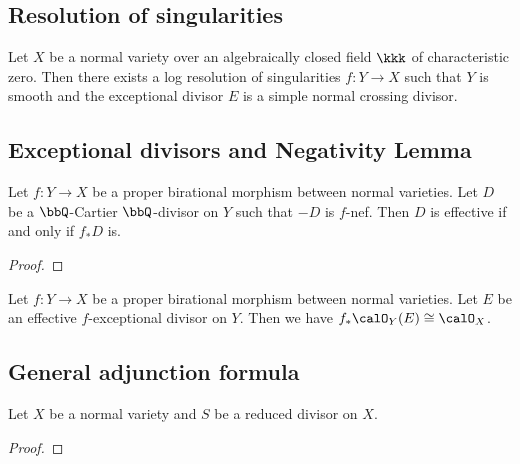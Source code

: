 \subsection{Resolution of singularities}

    \begin{theorem}\label{thm:log_resolution_in_characteristic_zero_for_varieties}
        Let \(X\) be a normal variety over an algebraically closed field \(\kkk\) of characteristic zero.
        Then there exists a log resolution of singularities \(f: Y \to X\) such that \(Y\) is smooth and the exceptional divisor \(E\) is a simple normal crossing divisor.
    \end{theorem}

\subsection{Exceptional divisors and Negativity Lemma}

    \begin{theorem}\label{thm:negativity_lemma}
        Let \(f: Y \to X\) be a proper birational morphism between normal varieties.
        Let \(D\) be a \(\bbQ\)-Cartier \(\bbQ\)-divisor on \(Y\) such that \(-D\) is \(f\)-nef.
        Then \(D\) is effective if and only if \(f_*D\) is.
    \end{theorem}
    \begin{proof}
    \end{proof}

    
    \begin{proposition}\label{prop:pushout_of_O_X_E_with_E_effective_exceptional_along_birational_morphism}
        Let \(f: Y \to X\) be a proper birational morphism between normal varieties.
        Let \(E\) be an effective \(f\)-exceptional divisor on \(Y\).
        Then we have \(f_* \calO_Y(E) \cong \calO_X\).
    \end{proposition}

\subsection{General adjunction formula}

    \begin{theorem}\label{thm:general_adjuction_formula}
        Let \(X\) be a normal variety and \(S\) be a reduced divisor on \(X\).
    \end{theorem}
    \begin{proof}
    \end{proof}


